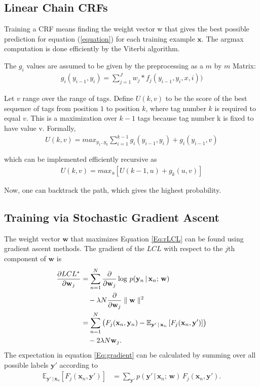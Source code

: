 \documentclass[10pt,twocolumn,letterpaper]{article}
\newcommand{\x}{\mathbf{x}}
\newcommand{\y}{\mathbf{y}}
\newcommand{\w}{\mathbf{w}}
\begin{document}
\subsection{Linear Chain CRFs}
Training a CRF means finding the weight vector w that gives the best possible prediction for equation (\ref{equation}) for each training example $\x$. The argmax computation is done efficiently by the Viterbi algorithm. 

The $g_i$ values are assumed to be given by the preprocessing as a $m$ by $m$ Matrix:
\begin{align}
g_i(y_{i-1},y_i) = \sum_{j=1}^{J} w_j*f_j(y_{i-1},y_{i},x,i))  
\end{align}

Let $v$ range over the range of tags. Define $U(k, v)$ to be the score of the best
sequence of tags from position $1$ to position $k$, where tag number $k$ is required to
equal $v$. This is a maximization over $k - 1$ tags because tag number k is fixed to
have value v. Formally, 
\begin{align}
U(k,v)=max_{y_1 .. y_k} \sum_{i=1}^{k-1} g_i(y_{i-1},y_i) + g_i(y_{i-1},v)
\end{align}

which can be implemented efficiently recursive as
\begin{align}
U(k, v) = max_u [U(k-1, u) + g_k(u, v)]
\label{recu}
\end{align}

Now, one can backtrack the path, which gives the highest probability.


\subsection{Training via Stochastic Gradient Ascent}
The weight vector $\w$ that maximizes Equation \ref{Eq:rLCL} can be found using gradient ascent methods. The gradient of the $LCL$ with respect to the $j$th component of $\w$ is
\begin{align}
	\frac{\partial LCL^*}{\partial \w_j } &= 
		\sum_{n=1}^N \frac{\partial}{\partial \w_j }  \log\,p(\y_n\,|\,\x_n ;\,\w)  \notag \\
	&\hspace{1 em} - \lambda N  \frac{\partial}{\partial \w_j }\parallel \w \parallel^2 \\
	&= \sum_{n=1}^N \left( F_j(\x_n,\y_n) -   \mathbb{E}_{\y'\,|\,\x_n} \left[ F_j(\x_n, \y' ) \right] \right)  \notag \\
	&\hspace{1 em} 	- 2 \lambda N   \w_{j}. \label{Eq:gradient}
\end{align}
The expectation in equation \ref{Eq:gradient} can be calculated by summing over all possible labels $\y'$ according to
\begin{align}
	\mathbb{E}_{\y'\,|\,\x_n} \left[ F_j(\x_n, \y' ) \right] &= \sum_{\y'} p(\y'\,|\,\x_n ;\,\w)\,F_j(\x_n, \y' ). \label{Eq:expectation}
\end{align}
\end{document}
